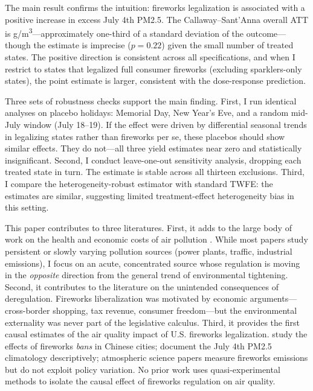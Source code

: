 \documentclass[12pt]{article}
\begin{document}
The main result confirms the intuition: fireworks legalization is associated with a positive increase in excess July 4th PM2.5. The Callaway--Sant'Anna overall ATT is \hspace{0pt}\textmu g/m\textsuperscript{3}---approximately one-third of a standard deviation of the outcome---though the estimate is imprecise ($p = 0.22$) given the small number of treated states. The positive direction is consistent across all specifications, and when I restrict to states that legalized full consumer fireworks (excluding sparklers-only states), the point estimate is larger, consistent with the dose-response prediction.

Three sets of robustness checks support the main finding. First, I run identical analyses on placebo holidays: Memorial Day, New Year's Eve, and a random mid-July window (July 18--19). If the effect were driven by differential seasonal trends in legalizing states rather than fireworks per se, these placebos should show similar effects. They do not---all three yield estimates near zero and statistically insignificant. Second, I conduct leave-one-out sensitivity analysis, dropping each treated state in turn. The estimate is stable across all thirteen exclusions. Third, I compare the heterogeneity-robust \citet{callaway2021difference} estimator with standard TWFE: the estimates are similar, suggesting limited treatment-effect heterogeneity bias in this setting.

This paper contributes to three literatures. First, it adds to the large body of work on the health and economic costs of air pollution \citep{chay2003impact, deryugina2019mortality, isen2017every, graff2012environment, schlenker2016airports, ebenstein2016long}. While most papers study persistent or slowly varying pollution sources (power plants, traffic, industrial emissions), I focus on an acute, concentrated source whose regulation is moving in the \textit{opposite} direction from the general trend of environmental tightening. Second, it contributes to the literature on the unintended consequences of deregulation. Fireworks liberalization was motivated by economic arguments---cross-border shopping, tax revenue, consumer freedom---but the environmental externality was never part of the legislative calculus. Third, it provides the first causal estimates of the air quality impact of U.S. fireworks legalization. \citet{tan2022fireworks} study the effects of fireworks \textit{bans} in Chinese cities; \citet{seidel2014climatology} document the July 4th PM2.5 climatology descriptively; atmospheric science papers \citep{li2017fireworks, bishop2023fireworks} measure fireworks emissions but do not exploit policy variation. No prior work uses quasi-experimental methods to isolate the causal effect of fireworks regulation on air quality.
\end{document}
